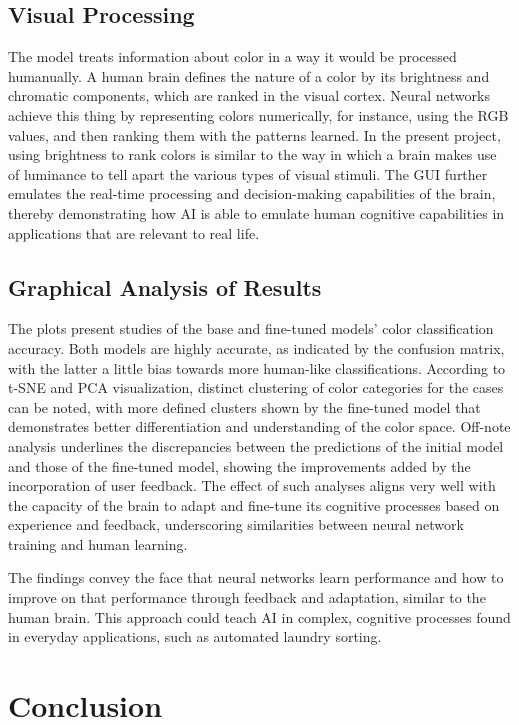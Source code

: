 \documentclass{article}
\begin{document}
\subsection{Visual Processing}
The model treats information about color in a way it would be processed humanually. A human brain defines the nature of a color by its brightness and chromatic components, which are ranked in the visual cortex. Neural networks achieve this thing by representing colors numerically, for instance, using the RGB values, and then ranking them with the patterns learned. In the present project, using brightness to rank colors is similar to the way in which a brain makes use of luminance to tell apart the various types of visual stimuli. The GUI further emulates the real-time processing and decision-making capabilities of the brain, thereby demonstrating how AI is able to emulate human cognitive capabilities in applications that are relevant to real life.
\subsection{Graphical Analysis of Results}
The plots present studies of the base and fine-tuned models' color classification accuracy. Both models are highly accurate, as indicated by the confusion matrix, with the latter a little bias towards more human-like classifications. According to t-SNE and PCA visualization, distinct clustering of color categories for the cases can be noted, with more defined clusters shown by the fine-tuned model that demonstrates better differentiation and understanding of the color space. Off-note analysis underlines the discrepancies between the predictions of the initial model and those of the fine-tuned model, showing the improvements added by the incorporation of user feedback. The effect of such analyses aligns very well with the capacity of the brain to adapt and fine-tune its cognitive processes based on experience and feedback, underscoring similarities between neural network training and human learning.

The findings convey the face that neural networks learn performance and how to improve on that performance through feedback and adaptation, similar to the human brain. This approach could teach AI in complex, cognitive processes found in everyday applications, such as automated laundry sorting.

\newpage

\section{Conclusion}
\end{document}
